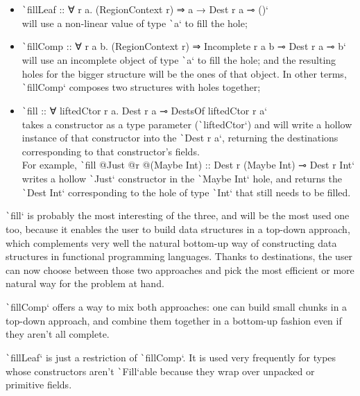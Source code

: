 \documentclass[english]{jflart}
\begin{document}
\begin{itemize}
  \item \texttt`fillLeaf :: ∀ r a. (RegionContext r) ⇒ a → Dest r a ⊸ ()` \\will use a non-linear value of type \texttt`a` to fill the hole;
  \item \texttt`fillComp :: ∀ r a b. (RegionContext r) ⇒ Incomplete r a b ⊸ Dest r a ⊸ b` \\will use an incomplete object of type \texttt`a` to fill the hole; and the resulting holes for the bigger structure will be the ones of that object. In other terms, \texttt`fillComp` composes two structures with holes together;
  \item \texttt`fill :: ∀ liftedCtor r a. Dest r a ⊸ DestsOf liftedCtor r a` \\takes a constructor as a type parameter (\texttt`liftedCtor`) and will write a hollow instance of that constructor into the \texttt`Dest r a`, returning the destinations corresponding to that constructor's fields.\\ For example, \texttt`fill @Just @r @(Maybe Int) :: Dest r (Maybe Int) ⊸ Dest r Int` writes a hollow \texttt`Just` constructor in the \texttt`Maybe Int` hole, and returns the \texttt`Dest Int` corresponding to the hole of type \texttt`Int` that still needs to be filled.
\end{itemize}

\texttt`fill` is probably the most interesting of the three, and will be the most used one too, because it enables the user to build data structures in a top-down approach, which complements very well the natural bottom-up way of constructing data structures in functional programming languages. Thanks to destinations, the user can now choose between those two approaches and pick the most efficient or more natural way for the problem at hand.

\texttt`fillComp` offers a way to mix both approaches: one can build small chunks in a top-down approach, and combine them together in a bottom-up fashion even if they aren't all complete.

\texttt`fillLeaf` is just a restriction of \texttt`fillComp`. It is used very frequently for types whose constructors aren't \texttt`Fill`able because they wrap over unpacked or primitive fields.
\end{document}
